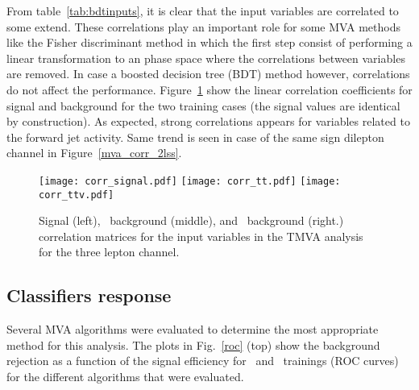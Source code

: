 From table~\ref{tab:bdtinputs}, it is clear that the input variables are correlated to some extend. These correlations play an important role for some MVA methods like the Fisher discriminant method in which the first step consist of performing a linear transformation to an phase space where the correlations between variables are removed. In case a boosted decision tree (BDT) method however, correlations do not affect the performance. Figure~\ref{mva_corr} show the linear correlation coefficients for signal and background for the two training cases (the signal values are identical by construction). As expected, strong correlations appears for variables related to the forward jet activity. Same trend is seen in case of the same sign dilepton channel in Figure~\ref{mva_corr_2lss}.

\begin{figure} [!h]
  \centering
   \texttt{[image: corr\_signal.pdf]}
   \texttt{[image: corr\_tt.pdf]}
   \texttt{[image: corr\_ttv.pdf]}

\caption[Correlation matrices for the BDT input variables.]{ Signal (left), \ttbar\ background (middle), and \ttV\ background (right.) correlation matrices for the input variables in the TMVA analysis for the three lepton channel.}
\label{mva_corr}
\end{figure}


\subsection{Classifiers response}
Several MVA algorithms were evaluated to determine the most appropriate method for this analysis. The plots in Fig.~\ref{roc} (top) show the background rejection as a function of the signal efficiency for \ttbar\ and \ttV\ trainings (ROC curves) for the different algorithms that were evaluated.

